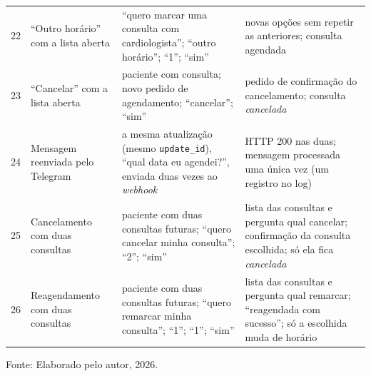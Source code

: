 \documentclass[12pt,a4paper]{extarticle}
\begin{document}
{\begin{xltabular}{\textwidth}{p{0.5cm}L{3cm}YL{4.6cm}}
22 & ``Outro horário'' com a lista aberta & ``quero marcar uma consulta com cardiologista''; ``outro horário''; ``1''; ``sim'' & novas opções sem repetir as anteriores; consulta agendada \\
23 & ``Cancelar'' com a lista aberta & paciente com consulta; novo pedido de agendamento; ``cancelar''; ``sim'' & pedido de confirmação do cancelamento; consulta \textit{cancelada} \\
24 & Mensagem reenviada pelo Telegram & a mesma atualização (mesmo \texttt{update\_id}), ``qual data eu agendei?'', enviada duas vezes ao \textit{webhook} & HTTP 200 nas duas; mensagem processada uma única vez (um registro no log) \\
25 & Cancelamento com duas consultas & paciente com duas consultas futuras; ``quero cancelar minha consulta''; ``2''; ``sim'' & lista das consultas e pergunta qual cancelar; confirmação da consulta escolhida; só ela fica \textit{cancelada} \\
26 & Reagendamento com duas consultas & paciente com duas consultas futuras; ``quero remarcar minha consulta''; ``1''; ``1''; ``sim'' & lista das consultas e pergunta qual remarcar; ``reagendada com sucesso''; só a escolhida muda de horário \\
\end{xltabular}
}
\vspace{0.3cm}

\footnotesize{Fonte: Elaborado pelo autor, 2026.}

\newpage
{}
\label{ap:sus}
\end{document}
